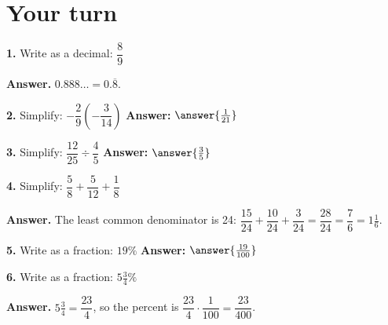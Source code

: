 \documentclass{ximera}
\begin{document}
\section*{Your turn}

\begin{problem}
\textbf{1.} Write as a decimal: $\dfrac{8}{9}$

\begin{hint}
\textbf{Answer.} $0.888\ldots = 0.\overline{8}$.
\end{hint}
\end{problem}

\begin{problem}
\textbf{2.} Simplify: $-\dfrac{2}{9}\left(-\dfrac{3}{14}\right)$ \qquad
\textbf{Answer:} $\answer{\frac{1}{21}}$
\end{problem}

\begin{problem}
\textbf{3.} Simplify: $\dfrac{12}{25} \div \dfrac{4}{5}$ \qquad
\textbf{Answer:} $\answer{\frac{3}{5}}$
\end{problem}

\begin{problem}
\textbf{4.} Simplify: $\dfrac{5}{8}+\dfrac{5}{12}+\dfrac{1}{8}$

\begin{hint}
\textbf{Answer.} The least common denominator is 24:
$\dfrac{15}{24}+\dfrac{10}{24}+\dfrac{3}{24}=\dfrac{28}{24}=\dfrac{7}{6}=1\frac{1}{6}$.
\end{hint}
\end{problem}

\begin{problem}
\textbf{5.} Write as a fraction: $19\%$ \qquad \textbf{Answer:} $\answer{\frac{19}{100}}$
\end{problem}

\begin{problem}
\textbf{6.} Write as a fraction: $5\frac{3}{4}\%$

\begin{hint}
\textbf{Answer.} $5\frac{3}{4}=\dfrac{23}{4}$, so the percent is
$\dfrac{23}{4}\cdot\dfrac{1}{100}=\dfrac{23}{400}$.
\end{hint}
\end{problem}
\end{document}
